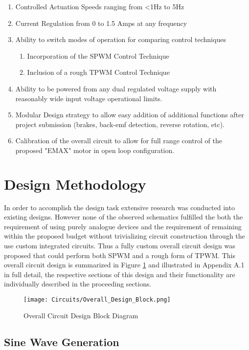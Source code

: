 \documentclass[12pt]{article}
\begin{document}
\begin{enumerate}
\item Controlled Actuation Speeds ranging from <1Hz to 5Hz
\item Current Regulation from 0 to 1.5 Amps at any frequency
\item Ability to switch modes of operation for comparing control techniques
\begin{enumerate}
\item Incorporation of the SPWM Control Technique
\item Inclusion of a rough TPWM Control Technique
\end{enumerate}
\item Ability to be powered from any dual regulated voltage supply with reasonably wide input voltage operational limits.
\item Modular Design strategy to allow easy addition of additional functions after project submission (brakes, back-emf detection, reverse rotation, etc).
\item Calibration of the overall circuit to allow for full range control of the proposed "EMAX" motor in open loop configuration.
\end{enumerate}

\section{Design Methodology}%

In order to accomplish the design task extensive research was conducted into existing designs. However none of the observed schematics fulfilled the both the requirement of using purely analogue devices and the requirement of remaining within the proposed budget without trivializing circuit construction through the use custom integrated circuits. Thus a fully custom overall circuit design was proposed that could perform both SPWM and a rough form of TPWM. This overall circuit design is summarized in Figure \ref{Circuit_Schematic_Summary} and illustrated in Appendix A.1 in full detail, the respective sections of this design and their functionality are individually described in the proceeding sections.

\begin{figure}[H]
\centering
\caption{Overall Circuit Design Block Diagram}
\texttt{[image: Circuits/Overall\_Design\_Block.png]}
\label{Circuit_Schematic_Summary}
\end{figure}

\subsection{Sine Wave Generation}%
\end{document}
